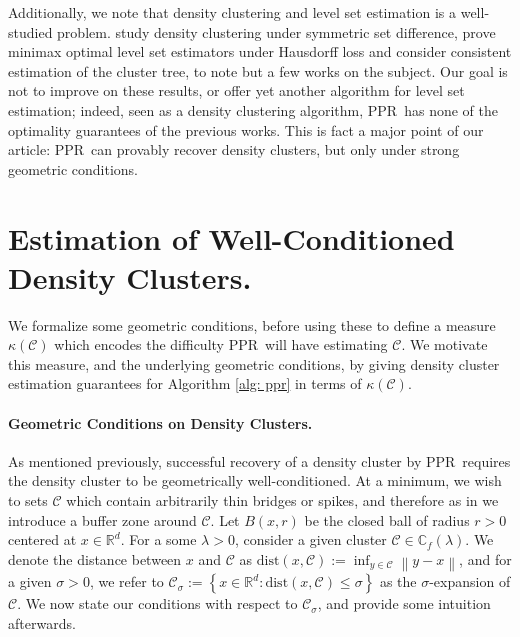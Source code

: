 \documentclass{article}
\newcommand{\set}[1]{\left\{#1\right\}}
\newcommand{\Reals}{\mathbb{R}}
\newcommand{\Rd}{\Reals^d}
\newcommand{\norm}[1]{\left\lVert#1\right\rVert}
\newcommand{\1}{\mathbf{1}}
\newcommand{\dist}{\mathrm{dist}}
\newcommand{\Cbb}{\mathbb{C}}
\newcommand{\Cset}{\mathcal{C}}
\newcommand{\Csig}{\Cset_{\sigma}}
\newcommand{\pprspace}{{\sc PPR~}}
\theoremstyle{aldenthm}
\theoremstyle{aldenrmrk}
\begin{document}
Additionally, we note that density clustering and level set estimation is a well-studied problem. \citep{polonik1995, rigollet2009} study density clustering under symmetric set difference, \citep{tsybakov1997, singh2009} prove minimax optimal level set estimators under Hausdorff loss and \citep{hartigan1981, chaudhuri2010} consider consistent estimation of the cluster tree, to note but a few works on the subject. Our goal is not to improve on these results, or offer yet another algorithm for level set estimation; indeed, seen as a density clustering algorithm, \pprspace has none of the optimality guarantees of the previous works. This is fact a major point of our article: \pprspace can provably recover density clusters, but only under strong geometric conditions. 

\section{Estimation of Well-Conditioned Density Clusters.}
\label{sec: consistent_cluster_estimation_with_ppr}

We formalize some geometric conditions, before using these to define a measure $\kappa(\Cset)$ which encodes the difficulty \pprspace will have estimating $\Cset$. We motivate this measure, and the underlying geometric conditions, by giving density cluster estimation guarantees for Algorithm \ref{alg: ppr} in terms of $\kappa(\Cset)$.

\paragraph{Geometric Conditions on Density Clusters.}

As mentioned previously, successful recovery of a density cluster by \pprspace requires the density cluster to be geometrically well-conditioned. At a minimum, we wish to sets $\Cset$ which contain arbitrarily thin bridges or spikes, and therefore as in \cite{chaudhuri2010} we introduce a buffer zone around $\Cset$. Let $B(x,r)$ be the closed ball of radius $r > 0$ centered at $x \in \Rd$. For a some $\lambda > 0$, consider a given cluster $\Cset \in \Cbb_f(\lambda)$. We denote the distance between $x$ and $\Cset$ as $\dist(x,\Cset) := \inf_{y \in \Cset} \norm{y - x}$, and for a given $\sigma > 0$, we refer to $\Csig := \set{x \in \Reals^d: \dist(x,\Cset) \leq \sigma}$ as the $\sigma$-expansion of $\Cset$. We now state our conditions with respect to $\Csig$, and provide some intuition afterwards.
\end{document}
